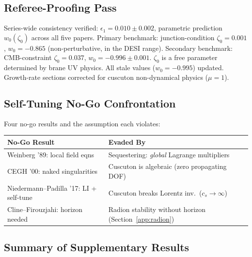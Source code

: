 \subsection{Referee-Proofing Pass}

Series-wide consistency verified: $\epsilon_1 = 0.010 \pm 0.002$, parametric prediction $w_0(\zeta_0)$ across all five papers. Primary benchmark: junction-condition $\zeta_0 = 0.001$, $w_0 = -0.865$ (non-perturbative, in the DESI range). Secondary benchmark: CMB-constraint $\zeta_0 = 0.037$, $w_0 = -0.996 \pm 0.001$. $\zeta_0$ is a free parameter determined by brane UV physics. All stale values ($w_0 = -0.995$) updated. Growth-rate sections corrected for cuscuton non-dynamical physics ($\mu = 1$).

\subsection{Self-Tuning No-Go Confrontation}

Four no-go results and the assumption each violates:

\begin{center}
\small
\begin{tabular}{l p{7cm}}
\hline
No-Go Result & Evaded By \\
\hline
Weinberg '89: local field eqns & Sequestering: \emph{global} Lagrange multipliers \\
CEGH '00: naked singularities & Cuscuton is algebraic (zero propagating DOF) \\
Niedermann--Padilla '17: LI + self-tune & Cuscuton breaks Lorentz inv.\ ($c_s \to \infty$) \\
Cline--Firouzjahi: horizon needed & Radion stability without horizon (Section~\ref{app:radion}) \\
\hline
\end{tabular}
\end{center}

\subsection{Summary of Supplementary Results}

